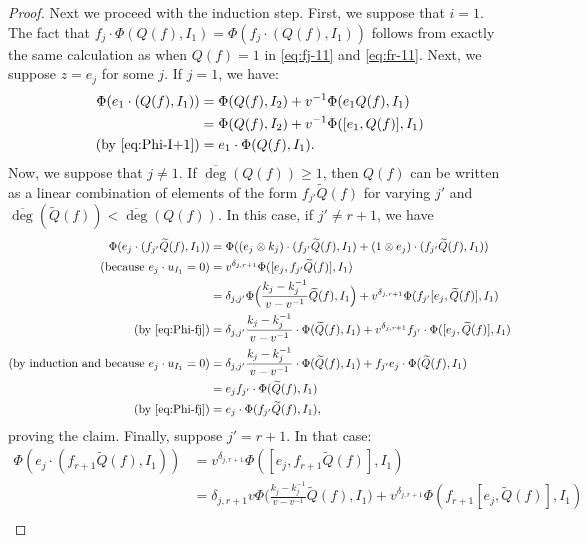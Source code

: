 \documentclass[10pt,a4paper]{amsart}
\newcommand{\ol}{\overline}
\begin{document}
\begin{proof}
Next we proceed with the induction step. First, we suppose that $i=1$. The fact that $f_j\cdot\Phi(Q(f),I_1)=\Phi(f_j\cdot(Q(f),I_1))$ follows from exactly the same calculation as when $Q(f)=1$ in \eqref{eq:fj-11} and \eqref{eq:fr-11}. Next, we suppose $z=e_j$ for some $j$. If $j=1$, we have:
\begin{align*}\Phi(e_1\cdot (Q(f),I_1)) & = \Phi(Q(f),I_2) + v^{-1}\Phi(e_1Q(f),I_1) \\
&= \Phi(Q(f),I_2) + v^{-1}\Phi([e_1,Q(f)],I_1) \\
\text{(by \eqref{eq:Phi-I+1})} &= e_1\cdot \Phi(Q(f),I_1).\end{align*}
Now, we suppose that $j\neq 1$. If $\ol\deg(Q(f))\geq 1$, then $Q(f)$ can be written as a linear combination of elements of the form $f_{j'}\widetilde Q(f)$ for varying $j'$ and $\ol\deg(\widetilde Q(f))< \ol\deg(Q(f))$. In this case, if $j'\neq r+1$, we have
\begin{align*}
\Phi(e_j\cdot(f_{j'}\widetilde Q(f), I_1))&=\Phi((e_j\otimes k_j)\cdot(f_{j'}\widetilde Q(f),I_1)+(1\otimes e_j)\cdot(f_{j'}\widetilde Q(f),I_1))\\
\text{(because $e_j\cdot u_{I_1}=0$)} &=v^{\delta_{j,r+1}}\Phi([e_j,f_{j'}\widetilde Q(f)], I_1)\\
&=\delta_{j,j'}\Phi\Big(\frac{k_{j}-k_{j}^{-1}}{v-v^{-1}}\widetilde Q(f),I_1\Big) + v^{\delta_{j,r+1}}\Phi(f_{j'}[e_j,\widetilde{Q}(f)],I_1)\\
\text{(by \eqref{eq:Phi-fj})}&=\delta_{j,j'}\frac{k_{j}-k_{j}^{-1}}{v-v^{-1}}\cdot\Phi(\widetilde Q(f),I_1) + v^{\delta_{j,r+1}}f_{j
'}\cdot \Phi([e_j,\widetilde{Q}(f)],I_1)\\
\text{(by induction and because $e_j\cdot u_{I_1}=0$)}&=\delta_{j,j'}\frac{k_{j}-k_{j}^{-1}}{v-v^{-1}}\cdot\Phi(\widetilde Q(f),I_1) + f_{j'}e_j\cdot\Phi(\widetilde{Q}(f),I_1)\\
&=e_jf_{j'}\cdot \Phi(\widetilde{Q}(f),I_1)\\
\text{(by \eqref{eq:Phi-fj})}&=e_j\cdot \Phi(f_{j'}\widetilde{Q}(f),I_1),
\end{align*}
proving the claim. Finally, suppose $j'=r+1$. In that case:
\begin{align*}
\Phi(e_j\cdot(f_{r+1}\widetilde Q(f), I_1))&=v^{\delta_{j,r+1}}\Phi([e_j,f_{r+1}\widetilde Q(f)], I_1)\\
&=\delta_{j,r+1}v\Phi\Big(\frac{k_j-k_j^{-1}}{v-v^{-1}}\widetilde Q(f),I_1\Big) + v^{\delta_{j,r+1}}\Phi(f_{r+1}[e_j,\widetilde{Q}(f)],I_1)\\

\end{align*}
\end{proof}
\end{document}
